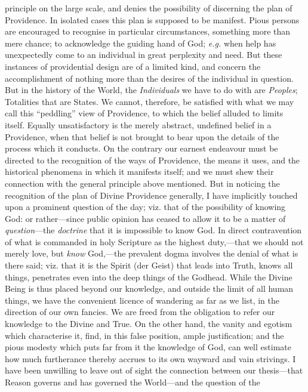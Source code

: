 principle on the large scale, and denies the possibility of discerning
the plan of Providence. In isolated cases this plan is supposed to be
manifest. Pious persons are encouraged to recognise in particular
circumstances, something more than mere chance; to acknowledge the
guiding hand of God; \textit{e.g.} when help has unexpectedly come to
an individual in great perplexity and need. But these instances of
providential design are of a limited kind, and concern the
accomplishment of nothing more than the desires of the individual in
question. But in the history of the World, the \textit{Individuals} we
have to do with are \textit{Peoples}; Totalities that are States. We
cannot, therefore, be satisfied with what we may call this
``peddling'' view of Providence, to which the belief alluded to limits
itself. Equally unsatisfactory is the merely abstract, undefined
belief in a Providence, when that belief is not brought to bear upon
the details of the process which it conducts. On the contrary our
earnest endeavour must be directed to the recognition  of the
ways of Providence, the means it uses, and the historical phenomena in
which it manifests itself; and we must shew their connection with the
general principle above mentioned. But in noticing the recognition of
the plan of Divine Providence generally, I have implicitly touched
upon a prominent question of the day; viz. that of the possibility of
knowing God: or rather---since public opinion has ceased to allow it
to be a matter of \textit{question}---the \textit{doctrine} that it is
impossible to know God. In direct contravention of what is commanded
in holy Scripture as the highest duty,---that we should not merely
love, but \textit{know} God,---the prevalent dogma involves the denial
of what is there said; viz. that it is the Spirit (der Geist) that
leads into Truth, knows all things, penetrates even into the deep
things of the Godhead. While the Divine Being is thus placed beyond
our knowledge, and outside the limit of all human things, we have the
convenient licence of wandering as far as we list, in the direction of
our own fancies. We are freed from the obligation to refer our
knowledge to the Divine and True. On the other hand, the vanity and
egotism which characterise it, find, in this false position, ample
justification; and the pious modesty which puts far from it the
knowledge of God, can well estimate how much furtherance thereby
accrues to its own wayward and vain strivings. I have been unwilling
to leave out of sight the connection between our thesis---that Reason
governs and has governed the World---and the question of the
